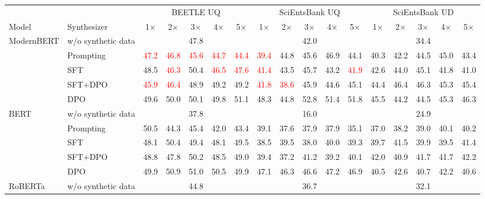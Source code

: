 \begin{table}[t]
\centering
\footnotesize
\setlength{\tabcolsep}{2pt}
\begin{tabular}{llccccccccccccccc}
\toprule
 & & \multicolumn{5}{c}{BEETLE UQ} & \multicolumn{5}{c}{SciEntsBank UQ} & \multicolumn{5}{c}{SciEntsBank UD} \\
\cmidrule(lr){3-7}\cmidrule(lr){8-12}\cmidrule(lr){13-17}
Model & Synthesizer & 1$\times$ & 2$\times$ & 3$\times$ & 4$\times$ & 5$\times$ & 1$\times$ & 2$\times$ & 3$\times$ & 4$\times$ & 5$\times$ & 1$\times$ & 2$\times$ & 3$\times$ & 4$\times$ & 5$\times$ \\
\midrule
\multirow{5}{*}{ModernBERT} & w/o synthetic data & \multicolumn{5}{c}{47.8} & \multicolumn{5}{c}{42.0} & \multicolumn{5}{c}{34.4} \\
 & Prompting & \textcolor{red}{47.2} & \textcolor{red}{46.8} & \textcolor{red}{45.6} & \textcolor{red}{44.7} & \textcolor{red}{44.4} & \textcolor{red}{39.4} & 44.8 & 45.6 & 46.9 & 44.1 & 40.3 & 42.2 & 44.5 & 45.0 & 43.4 \\
 & SFT & 48.5 & \textcolor{red}{46.3} & 50.4 & \textcolor{red}{46.5} & \textcolor{red}{47.6} & \textcolor{red}{41.4} & 43.5 & 45.7 & 43.2 & \textcolor{red}{41.9} & 42.6 & 44.0 & 45.1 & 41.8 & 41.0 \\
 & SFT+DPO & \textcolor{red}{45.9} & \textcolor{red}{46.4} & 48.9 & 49.2 & 49.2 & \textcolor{red}{41.8} & \textcolor{red}{38.6} & 45.9 & 44.6 & 45.1 & 44.4 & 46.4 & 46.3 & 45.3 & 45.4 \\
 & DPO & 49.6 & 50.0 & 50.1 & 49.8 & 51.1 & 48.3 & 44.8 & 52.8 & 51.4 & 51.8 & 45.5 & 44.2 & 44.5 & 45.3 & 46.3 \\
\midrule
\multirow{5}{*}{BERT} & w/o synthetic data & \multicolumn{5}{c}{37.8} & \multicolumn{5}{c}{16.0} & \multicolumn{5}{c}{24.9} \\
 & Prompting & 50.5 & 44.3 & 45.4 & 42.0 & 43.4 & 39.1 & 37.6 & 37.9 & 37.9 & 35.1 & 37.0 & 38.2 & 39.0 & 40.1 & 40.2 \\
 & SFT & 48.1 & 50.4 & 49.4 & 48.1 & 49.5 & 38.5 & 39.5 & 38.0 & 40.0 & 39.3 & 39.7 & 41.5 & 39.9 & 39.5 & 41.4 \\
 & SFT+DPO & 48.8 & 47.8 & 50.2 & 48.5 & 49.0 & 39.4 & 37.2 & 41.2 & 39.2 & 40.1 & 42.0 & 40.9 & 41.7 & 41.7 & 42.2 \\
 & DPO & 49.9 & 50.9 & 51.0 & 50.5 & 49.9 & 47.1 & 46.3 & 46.6 & 47.2 & 46.9 & 40.5 & 42.6 & 40.7 & 42.2 & 40.6 \\
\midrule
\multirow{5}{*}{RoBERTa} & w/o synthetic data & \multicolumn{5}{c}{44.8} & \multicolumn{5}{c}{36.7} & \multicolumn{5}{c}{32.1} \\

\end{tabular}
\end{table}
